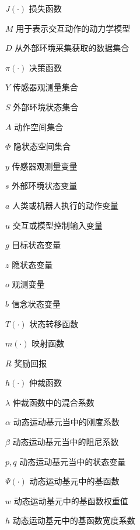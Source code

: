 
\begin{notation}

  \begin{notationlist}{2em}
    \item[$\displaystyle J(·)$] 损失函数
    \item[$\displaystyle M$] 用于表示交互动作的动力学模型
    \item[$\displaystyle D$] 从外部环境采集获取的数据集合
    \item[$\displaystyle \pi(·)$] 决策函数
    \item[$\displaystyle Y$] 传感器观测量集合
    \item[$\displaystyle S$] 外部环境状态集合
    \item[$\displaystyle A$] 动作空间集合
    \item[$\displaystyle \Phi$] 隐状态空间集合
    \item[$\displaystyle y$] 传感器观测量变量
    \item[$\displaystyle s$] 外部环境状态变量
    \item[$\displaystyle a$] 人类或机器人执行的动作变量
    \item[$\displaystyle u$] 交互或模型控制输入变量
    \item[$\displaystyle g$] 目标状态变量
    \item[$\displaystyle z$] 隐状态变量
    \item[$\displaystyle o$] 观测变量
    \item[$\displaystyle b$] 信念状态变量
    \item[$\displaystyle T(·)$] 状态转移函数
    \item[$\displaystyle m(·)$] 映射函数
    \item[$\displaystyle R$] 奖励回报
    \item[$\displaystyle h(·)$] 仲裁函数
    \item[$\displaystyle \lambda$] 仲裁函数中的混合系数
    \item[$\displaystyle \alpha$] 动态运动基元当中的刚度系数
    \item[$\displaystyle \beta$] 动态运动基元当中的阻尼系数
    \item[$\displaystyle p,q$] 动态运动基元当中的状态变量
    \item[$\displaystyle \Psi(·)$] 动态运动基元中的基函数
    \item[$\displaystyle w$] 动态运动基元中的基函数权重值
    \item[$\displaystyle h$] 动态运动基元中的基函数宽度系数

\end{notationlist}
\end{notation}

